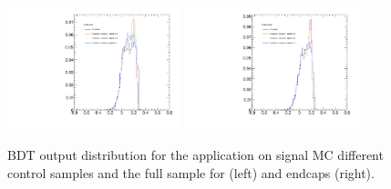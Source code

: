 \begin{figure}
  \centering
  \includegraphics[width=0.45\textwidth]{Figures/ApplicationBDTOutput_BsMCBarrel.pdf}
  \includegraphics[width=0.45\textwidth]{Figures/ApplicationBDTOutput_BsMCEndcaps.pdf}
  \caption{BDT output distribution for the application on \BsMuMu signal MC different control samples and the full sample for (left) and endcaps (right).}
  \label{fig:applicationBDTOutputSignal}
\end{figure}
